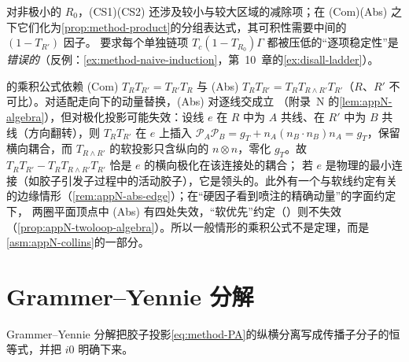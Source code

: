 对非极小的 $R_0$，(CS1)(CS2) 还涉及较小与较大区域的减除项；在 (Com)(Abs) 之下它们化为\cref{prop:method-product}的分组表达式，其可积性需要中间的 $(1-T_{R'})$ 因子。
要求每个单独链项 $T_c(1-T_{R_0})\Gamma$ 都被压低的“逐项稳定性”是\emph{错误的}（反例：\cref{ex:method-naive-induction}，第~10~章的\cref{ex:disall-ladder}）。

\begin{remark}\label{rem:method-abs-failure}
的乘积公式依赖 (Com) $T_RT_{R'}=T_{R'}T_R$ 与 (Abs) $T_RT_{R'}=T_RT_{R\wedge R'}T_{R'}$（$R$、$R'$ 不可比）。对适配走向下的动量替换，(Abs) 对逐线交成立
（附录~N 的\cref{lem:appN-algebra}），但对极化投影可能失效：设线 $e$ 在 $R$ 中为 $A$ 共线、在 $R'$ 中为 $B$ 共线（方向翻转），则 $T_RT_{R'}$ 在 $e$ 上插入
$\mathcal P_A\mathcal P_B=g_T+n_A(n_B\cdot n_B)n_A=g_T$，保留横向耦合，而 $T_{R\wedge R'}$ 的软投影只含纵向的 $n\otimes n$，零化 $g_T$。故 $T_RT_{R'}-T_RT_{R\wedge R'}T_{R'}$ 恰是 $e$ 的横向极化在该连接处的耦合；
若 $e$ 是物理的最小连接（如胶子引发子过程中的活动胶子），它是领头的。此外有一个与软线约定有关的边缘情形（\cref{rem:appN-abs-edge}）；在“硬因子看到喷注的精确动量”的字面约定下，
两圈平面顶点中 (Abs) 有四处失效，“软优先”约定（\cite[第~10.6.6~节]{Collins2011}）则不失效（\cref{prop:appN-twoloop-algebra}）。所以一般情形的乘积公式不是定理，而是\cref{asm:appN-collins}的一部分。
\end{remark}

\section{Grammer--Yennie 分解}\label{sec:method-gy}

Grammer--Yennie 分解把胶子投影\cref{eq:method-PA}的纵横分离写成传播子分子的恒等式，并把 $i0$ 明确下来。

